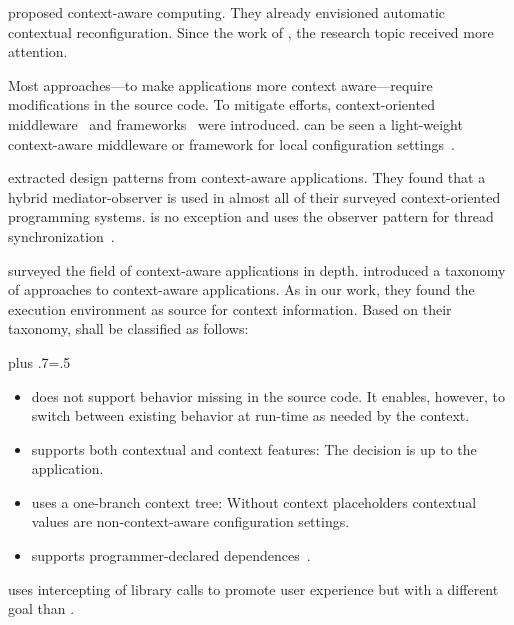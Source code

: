
\citet{schilit1994context} proposed context-aware computing.
They already envisioned automatic contextual reconfiguration.
Since the work of \citet{dey2000towards}, the research topic received more attention.

Most approaches---to make applications more context aware---require modifications in the source code.
To mitigate efforts, context-oriented middleware~\cite{geihs2009comprehensive,henricksen2005middleware,gu2004middleware,anthony2009context} and frameworks~\cite{williams2014contextion,raento2005contextphone} were introduced.
\elektra{} can be seen a light-weight context-aware middleware or framework for local configuration settings~\cite{raab2016unanticipated}.

\citet{riva2006unearthing} extracted design patterns from context-aware applications.
They found that a hybrid mediator-observer is used in almost all of their surveyed context-oriented programming systems.
\elektra{} is no exception and uses the observer pattern for thread synchronization~\cite{raab2015global}.



\citet{baldauf2007survey,hong2009context,alegre2016engineering} surveyed the field of context-aware applications in depth.
\citet{mens2016taxonomy} introduced a taxonomy of approaches to context-aware applications.
As in our work, they found the execution environment as source for context information.
Based on their taxonomy, \elektra{} shall be classified as follows:%
{\parfillskip=0pt plus .7\textwidth \emergencystretch=.5\textwidth \par}
\begin{itemize}
\item \elektra{} does not support behavior missing in the source code.
It enables, however, to switch between existing behavior at run-time as needed by the context.
\item \elektra{} supports both contextual and context features:
The decision is up to the application.
\item \elektra{} uses a one-branch context tree:
Without context placeholders contextual values are non-context-aware configuration settings.
\item \elektra{} supports programmer-declared dependences~\cite{raab2016persistent}.
\end{itemize}


\citet{alexandrov1998ufo} uses intercepting of library calls to promote user experience but with a different goal than \elektra{}.

